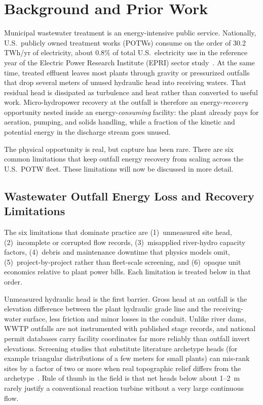 \documentclass[12pt,letterpaper]{report}
\begin{document}
\chapter{Background and Prior Work}

Municipal wastewater treatment is an energy-intensive public service. Nationally,
U.S.\ publicly owned treatment works (POTWs) consume on the order of 30.2 TWh/yr of
electricity, about 0.8\% of total U.S.\ electricity use in the reference year of the
Electric Power Research Institute (EPRI) sector study~\cite{epri2013}. At the same time,
treated effluent leaves most plants through gravity or pressurized outfalls that drop
several meters of unused hydraulic head into receiving waters. That residual head is
dissipated as turbulence and heat rather than converted to useful work. Micro-hydropower
recovery at the outfall is therefore an energy-\emph{recovery} opportunity nested inside
an energy-\emph{consuming} facility: the plant already pays for aeration, pumping, and
solids handling, while a fraction of the kinetic and potential energy in the discharge
stream goes unused.

The physical opportunity is real, but capture has been rare. There are six common
limitations that keep outfall energy recovery from scaling across the U.S.\ POTW fleet.
These limitations will now be discussed in more detail.

\section{Wastewater Outfall Energy Loss and Recovery Limitations}

The six limitations that dominate practice are (1)~unmeasured site head, (2)~incomplete
or corrupted flow records, (3)~misapplied river-hydro capacity factors, (4)~debris and
maintenance downtime that physics models omit, (5)~project-by-project rather than
fleet-scale screening, and (6)~opaque unit economics relative to plant power bills.
Each limitation is treated below in that order.

Unmeasured hydraulic head is the first barrier. Gross head at an outfall is the elevation
difference between the plant hydraulic grade line and the receiving-water surface, less
friction and minor losses in the conduit. Unlike river dams, WWTP outfalls are not
instrumented with published stage records, and national permit databases carry facility
coordinates far more reliably than outfall invert elevations. Screening studies that
substitute literature archetype heads (for example triangular distributions of a few
meters for small plants) can mis-rank sites by a factor of two or more when real
topographic relief differs from the archetype~\cite{ornl2014}. Rule of thumb in the field
is that net heads below about 1--2~m rarely justify a conventional reaction turbine
without a very large continuous flow.
\end{document}
